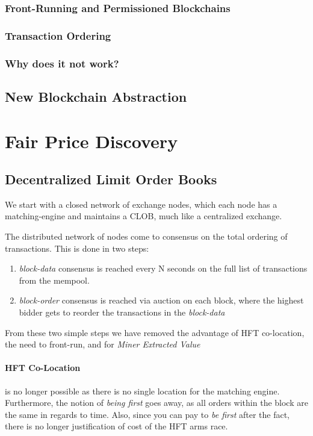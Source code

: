 \documentclass[12pt]{article}
\begin{document}
\subsubsection*{Front-Running and Permissioned Blockchains}
\subsubsection*{Transaction Ordering}
\subsubsection*{Why does it not work?}
\subsection*{New Blockchain Abstraction}

\section{Fair Price Discovery} 

\subsection{Decentralized Limit Order Books}
We start with a closed network of exchange nodes, which each node has a matching-engine and maintains a CLOB, much like a centralized exchange. 

The distributed network of nodes come to consensus on the total ordering of transactions. This is done in two steps: 

\begin{enumerate}
    \item \emph{block-data} consensus is reached every N seconds on the full list of transactions from the mempool. 
    \item \emph{block-order} consensus is reached via auction on each block, where the highest bidder gets to reorder the transactions in the \emph{block-data} 
\end{enumerate}

From these two simple steps we have removed the advantage of HFT co-location, the need to front-run, and for \emph{Miner Extracted Value}

\paragraph*{HFT Co-Location} is no longer possible as there is no single location for the matching engine. Furthermore, the notion of \emph{being first} goes away, as all orders within the block are the same in regards to time. Also, since you can pay to \emph{be first} after the fact, there is no longer justification of cost of the HFT arms race. 
\end{document}
